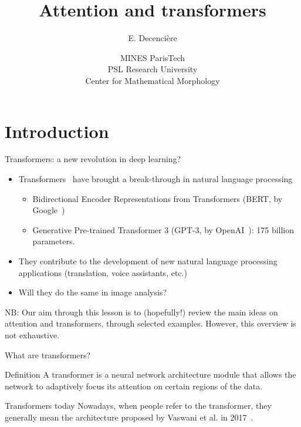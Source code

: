 \documentclass[xcolor=pdftex,dvipsnames,table,mathserif]{beamer}
\title{Attention and transformers}
\author{E. Decencière}
\date{MINES ParisTech\\
  PSL Research University\\
  Center for Mathematical Morphology
}
\begin{document}
\frame{\titlepage}


\section{Introduction}


\begin{frame}{Transformers: a new revolution in deep learning?}

\begin{itemize}
\item Transformers~\cite{vaswani_attention_2017} have brought a break-through in natural language processing
  \begin{itemize}
  \item Bidirectional Encoder Representations from Transformers (BERT, by Google~\cite{brown_language_2020})
  \item Generative Pre-trained Transformer 3 (GPT-3, by OpenAI~\cite{devlin_bert_2019}): 175 billion parameters.
  \end{itemize}
  \item They contribute to the development of new natural language processing applications (translation, voice assistants, etc.)
  \item Will they do the same in image analysis?
\end{itemize}

\vspace{1em}

\scriptsize{NB: Our aim through this lesson is to (hopefully!) review the main ideas on attention and transformers, through selected examples. However, this overview is not exhaustive.}

\end{frame}


\begin{frame}{What are transformers?}

\begin{block}{Definition}
A transformer is a neural network architecture module that allows the network to \alert{adaptively focus its attention} on certain regions of the data.
\end{block}

\pause

\begin{alertblock}{Transformers today}
  Nowadays, when people refer to the transformer, they generally mean the architecture proposed by Vaswani et al. in 2017~\cite{vaswani_attention_2017}.
\end{alertblock}

\end{frame}
\end{document}

